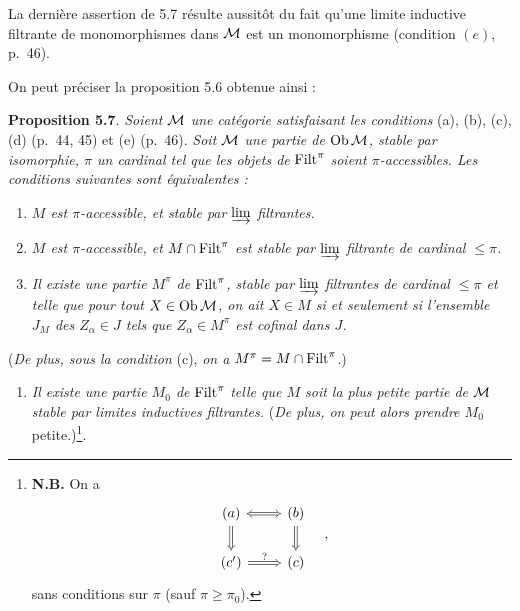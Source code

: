 
La dernière assertion de 5.7 résulte aussitôt du fait qu'une limite inductive filtrante de monomorphismes dans $\mathcal{M}$ est un monomorphisme (condition $(e)$, p.~46).

On peut préciser la proposition 5.6 obtenue ainsi :

\textbf{Proposition 5.7}. \textit{Soient $\mathcal{M}$ une catégorie satisfaisant les conditions} (a), (b), (c), (d) (p.~44, 45) et (e) (p.~46). \textit{Soit $\mathcal{M}$ une partie de} $\operatorname{Ob}\mathcal{M}$\textit{, stable par isomorphie, $\pi$ un cardinal tel que les objets de} $\mathrm{Filt}^\pi$ \textit{soient $\pi$-accessibles. Les conditions suivantes sont équivalentes :} %

\begin{enumerate}[label={}]
\item[a)] \textit{$M$ est $\pi$-accessible, et stable par $\varinjlim$ filtrantes.}
\item[b)] \textit{$M$ est $\pi$-accessible, et $M \cap \mathrm{Filt}^\pi$ est stable par $\varinjlim$ filtrante de cardinal $\leq \pi$.}
\item[c)] \textit{Il existe une partie $M^\pi$ de} $\mathrm{Filt}^\pi$\textit{, stable par $\varinjlim$ filtrantes de cardinal $\leq \pi$ et telle que pour tout $X \in \operatorname{Ob}\mathcal{M}$, on ait $X \in M$ si et seulement si l'ensemble $J_M$ des $Z_\alpha \in J$ tels que $Z_\alpha \in M^\pi$ est cofinal dans $J$.}
\end{enumerate}

(\textit{De plus, sous la condition} (c), \textit{on a}
$M^\pi = M \cap \mathrm{Filt}^\pi$.)
\begin{enumerate}[label={}]
\item[c$'$)] \textit{Il existe une partie $M_0$ de} $\mathrm{Filt}^\pi$ \textit{telle que $M$ soit la plus petite partie de $\mathcal{M}$ stable par limites inductives filtrantes.} (\textit{De plus, on peut alors prendre $M_0$} petite.)\footnote[22]{\textbf{N.B.} On a
\[
\begin{tikzcd}[ampersand replacement=\&]
(a) \arrow[r, Leftrightarrow] \arrow[d, Rightarrow] \& (b) \arrow[d, Rightarrow] \\
(c') \arrow[r, Rightarrow, "?"] \& (c)
\end{tikzcd}
\quad ,
\]
sans conditions sur $\pi$ (sauf $\pi \geq \pi_0$).}.
\end{enumerate}


